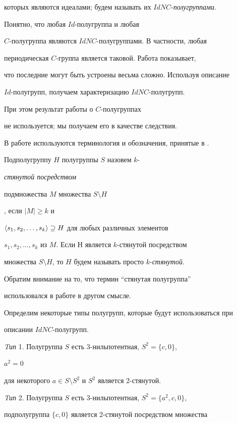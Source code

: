 которых являются идеалами; будем называть их $IdNC$-{\it полугруппами}.


Понятно, что любая $Id$-полугруппа и любая


$C$-полугруппа являются $IdNC$-полугруппами. В частности, любая


периодическая $C$-группа является таковой. Работа \cite{5} показывает,


что последние могут быть устроены весьма сложно. Используя описание


$Id$-полугрупп, получаем характеризацию $IdNC$-полугрупп.


При этом результат работы \cite{4} о $C$-полугруппах


не используется; мы получаем его в качестве следствия.





В работе используются терминология и обозначения, принятые в \cite{6}.


Подполугруппу $H$ полугруппы $S$ назовем $k$-{\it стянутой посредством


подмножества $M$ множества $S\setminus H$}, если $|M|\ge k$ и


$\langle s_1, s_2, \dotsc, s_k\rangle \supseteq H$ для любых различных элементов


$s_1, s_2, \dotsc, s_k$ из $M$. Если $Н$ является $k$-стянутой посредством


множества $S\setminus H$, то $H$ будем называть просто $k$-{\it стянутой}.


Обратим внимание на то, что термин ``стянутая полугруппа''


использовался в работе \cite{7} в другом смысле.





Определим некоторые типы полугрупп, которые будут использоваться при


описании $IdNC$-полугрупп.





{\it Tип} 1. Полугруппа $S$ есть $3$-нильпотентная, $S^2=\{c,0\}$,


$a^2=0$


для некоторого $a\in S\setminus S^2$ и $S^2$ является $2$-стянутой.





{\it Tип} 2. Полугруппа $S$ есть $3$-нильпотентная, $S^2=\{a^2, c, 0\}$,


подполугруппа $\{c,0\}$ является $2$-стянутой посредством множества


